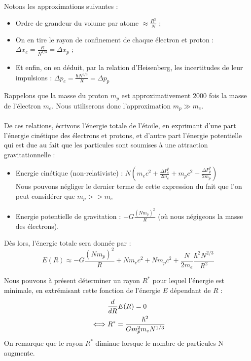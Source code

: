 \documentclass{book}
\begin{document}
Notons les approximations suivantes : 
\begin{itemize}%
    \item Ordre de grandeur du volume par atome $\approx \frac{R^3}{N}$ ;\\
    \item On en tire le rayon de confinement de chaque électron et proton : $\Delta x_e = \frac{R}{N^{1/3}} = \Delta x_p$ ; \\
    \item Et enfin, on en déduit, par la relation d'Heisenberg, les incertitudes de leur impulsions : $\Delta p_e = \frac{\hbar N^{1/3}}{R} = \Delta p_p$
\end{itemize} 

Rappelons que la masse du proton $m_p$ est approximativement $2000$ fois la masse de l'électron $m_e$. Nous utiliserons donc l'approximation $m_p \gg m_e$.

\paragraph{} De ces relations, écrivons l'énergie totale de l'étoile, en exprimant d'une part l'énergie cinétique des électrons et protons, et d'autre part l'énergie potentielle qui est due au fait que les particules sont soumises à une attraction gravitationnelle : \\

\begin{itemize}%
\item Energie cinétique (non-relativiste) : $N \left( m_e c^2 + \frac{\Delta P_e^2}{2 m_e} + m_p c^2 + \frac{\Delta P_p^2}{2 m_p} \right)$ \\
Nous pouvons négliger le dernier terme de cette expression du fait que l'on peut considérer que $m_p >> m_e$  \\
\item Energie potentielle de gravitation : $- G \frac{(Nm_p)^2}{R}$  (où nous négigeons la masse des électrons).\\
\end{itemize}

Dès lors, l'énergie totale sera donnée par :
\begin{equation}
E(R) \approx - G \frac{(Nm_p)^2}{R} + Nm_e c^2 + Nm_p c^2 + \frac{N}{2m_e} \frac{\hbar^2 N^{2/3}}{R^2}
\end{equation}

Nous pouvons à présent déterminer un rayon $R^*$ pour lequel l'énergie est minimale, en extrémisant cette fonction de l'énergie $E$ dépendant de $R$ : 
\begin{align}
\label{rayon d'energie minimale étoile}
    &\frac{d}{dR} E(R) = 0 \notag \\
    \iff &R^* = \frac{\hbar^2}{Gm_p^2m_eN^{1/3}}
\end{align}
On remarque que le rayon $R^*$ diminue lorsque le nombre de particules N augmente. \\
\end{document}
